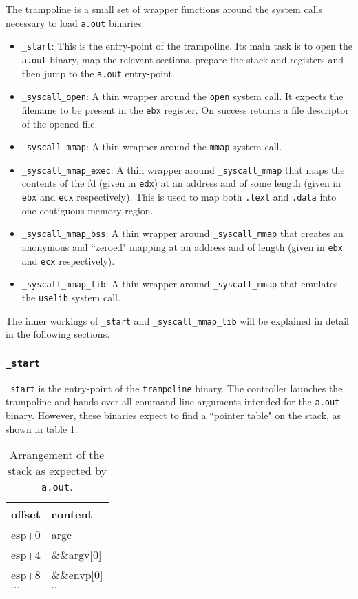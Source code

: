 \documentclass{article}
\begin{document}
The trampoline is a small set of wrapper functions around the system calls necessary to load \texttt{a.out} binaries:

\begin{itemize}
    \item \texttt{\_start}: This is the entry-point of the trampoline. Its main task is to open the \texttt{a.out} binary, map the relevant sections, prepare the stack and registers and then jump to the \texttt{a.out} entry-point.
    \item \texttt{\_syscall\_open}: A thin wrapper around the \texttt{open} system call. It expects the filename to be present in the \texttt{ebx} register. On success returns a file descriptor of the opened file.
    \item \texttt{\_syscall\_mmap}: A thin wrapper around the \texttt{mmap} system call.
    \item \texttt{\_syscall\_mmap\_exec}: A thin wrapper around \texttt{\_syscall\_mmap} that maps the contents of the fd (given in \texttt{edx}) at an address and of some length (given in \texttt{ebx} and \texttt{ecx} respectively). This is used to map both \texttt{.text} and \texttt{.data} into one contiguous memory region.
    \item \texttt{\_syscall\_mmap\_bss}: A thin wrapper around \texttt{\_syscall\_mmap} that creates an anonymous and ``zeroed" mapping at an address and of length (given in \texttt{ebx} and \texttt{ecx} respectively).
    \item \texttt{\_syscall\_mmap\_lib}: A thin wrapper around \texttt{\_syscall\_mmap} that emulates the \texttt{uselib} system call.
\end{itemize}

The inner workings of \texttt{\_start} and \texttt{\_syscall\_mmap\_lib} will be explained in detail in the following sections.

\subsubsection{\texttt{\_start}}

\texttt{\_start} is the entry-point of the \texttt{trampoline} binary. The controller launches the trampoline and hands over all command line arguments intended for the \texttt{a.out} binary. However, these binaries expect to find a ``pointer table" on the stack\cite[lines 54-59]{BinfmtAoutC}, as shown in table \ref{tab:expected_stack}.

\begin{table}[H]
    \centering
    \begin{tabular}{|l|l|}\hline
    offset & content       \\ \hline\hline
    esp+0  & argc          \\ \hline
    esp+4  & \&\&argv{[}0{]} \\ \hline
    esp+8  & \&\&envp{[}0{]} \\ \hline
    $\cdots$ & $\cdots$ \\ \hline
    \end{tabular}
    \caption{Arrangement of the stack as expected by \texttt{a.out}.}
    \label{tab:expected_stack}
\end{table}
\end{document}
